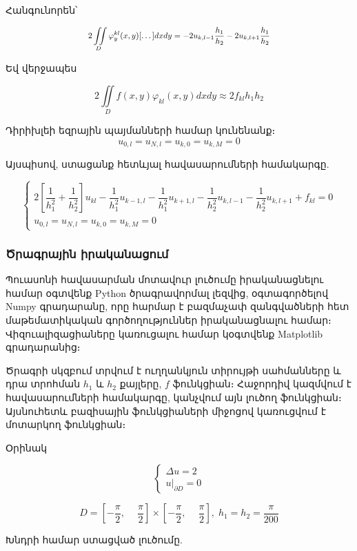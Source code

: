 \documentclass[fleqn, bachelor,subf,12pt,notitlepage]{article}
\newcommand\scalemath[2]{\scalebox{#1}{\mbox{\ensuremath{\displaystyle #2}}}}
\begin{document}
 \noindent Հանգունորեն՝

			$$\scalemath{0.85}{2 \iint \limits_{D}\varphi_{y}^{kl}(x,y)[\dots]dxdy =  -2u_{k, l-1}\dfrac{h_{1}} {h_{2}} - 2u_{k, l+1}\dfrac{h_{1}}{ h_{2}}}$$

\noindent Եվ վերջապես

	$$ 2\iint \limits_{D} f(x,y)\varphi_{kl}(x,y)dxdy \approx 2 f_{kl} h_{1} h_{2}$$

\noindent Դիրիխլեի եզրային պայմանների համար կունենանք։
$$u_{0, l} = u_{N, l} = u_{k, 0} = u_{k, M} = 0$$

\noindent Այսպիսով, ստացանք հետևյալ հավասարումների համակարգը.

$$
\begin{cases}

			2\left[\dfrac{1}{h^{2}_{1}} + \dfrac{1}{h^{2}_{2}}\right] u_{kl}  -\dfrac{1}{h^{2}_{1}}u_{k-1, l} - \dfrac{1}{h^{2}_{1}}u_{k+1, l} -\dfrac{1}{h^{2}_{2}}u_{k, l-1} - \dfrac{1}{h^{2}_{2}}u_{k, l+1} + f_{kl} = 0\\
			u_{0, l} = u_{N, l} = u_{k, 0} = u_{k, M} = 0
\end{cases}
$$

\newpage
\subsubsection*{Ծրագրային իրականացում}

Պուասոնի հավասարման մոտավուր լուծումը իրականացնելու համար օգտվենք Python ծրագրավորմալ լեզվից, օգտագործելով Numpy գրադարանը, որը հարմար է բազմաչափ զանգվածների հետ մաթեմատիկական գործողություններ իրականացնալու համար։ Վիզուալիզացիաները կառուցալու համար կօգտվենք Matplotlib գրադարանից։

Ծրագրի սկզբում տրվում է ուղղանկյուն տիրույթի սահմանները և դրա տրոհման $h_{1}$ և $h_{2}$ քայլերը, $f$ ֆունկցիան։ Հաջորդիվ կազմվում է հավասարումների համակարգը, կանչվում այն լուծող ֆունկցիան։ Այսնուհետև բազիսային ֆունկցիաների միջոցով կառուցվում է մոտարկող ֆունկցիան։

Օրինակ


				$$
					\begin{cases}
								\Delta u =2 \\
								u \Big |_{\partial D} = 0
					\end{cases}
				$$

				$$ D = \left[-\dfrac{\pi}{2}, \phantom{-}\dfrac{\pi}{2}\right] \times \left[-\dfrac{\pi}{2}, \phantom{-}\dfrac{\pi}{2}\right], \; h_{1}=h_{2}=\dfrac{\pi}{200}$$

\noindent Խնդրի համար ստացված լուծումը.
\end{document}
